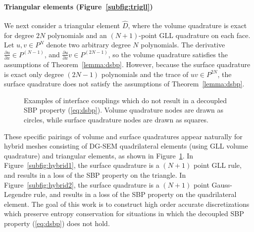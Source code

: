 \documentclass{svjour3}                     %
\renewcommand{\hat}{\widehat}
\newcommand{\pd}[2]{\frac{\partial#1}{\partial#2}}
\begin{document}
\paragraph{Triangular elements (Figure~\ref{subfig:trigll})} We next consider a triangular element $\hat{D}$, where the volume quadrature is exact for degree $2N$ polynomials \cite{xiao2010quadrature} and an $(N+1)$-point GLL quadrature on each face.  Let $u,v \in P^N$ denote two arbitrary degree $N$ polynomials.  The derivative $\pd{u}{x} \in P^{(N-1)}$, and $\pd{u}{x}v \in P^{(2N-1)}$, so the volume quadrature satisfies the assumptions of Theorem~\ref{lemma:dsbp}.  However, because the surface quadrature is exact only degree $(2N-1)$ polynomials and the trace of $uv\in P^{2N}$, the surface quadrature does not satisfy the assumptions of Theorem~\ref{lemma:dsbp}.

\begin{figure}
\centering
\begingroup
\captionsetup[subfigure]{width=.425\textwidth}
\endgroup
\hspace{2em}
\caption{Examples of interface couplings which do not result in a decoupled SBP property (\ref{eq:dsbp}). Volume quadrature nodes are drawn as circles, while surface quadrature nodes are drawn as  squares. }
\label{fig:hybrid}
\end{figure}

These specific pairings of volume and surface quadratures appear naturally for hybrid meshes consisting of DG-SEM quadrilateral elements (using GLL volume quadrature) and triangular elements, as shown in Figure~\ref{fig:hybrid}.  In Figure~\ref{subfig:hybrid1}, the surface quadrature is a $(N+1)$ point GLL rule, and results in a loss of the SBP property on the triangle.  In Figure~\ref{subfig:hybrid2}, the surface quadrature is a $(N+1)$ point Gauss-Legendre rule, and results in a loss of the SBP property on the quadrilateral element.  The goal of this work is to construct high order accurate discretizations which preserve entropy conservation for situations in which the decoupled SBP property (\ref{eq:dsbp}) does not hold.  
\end{document}
